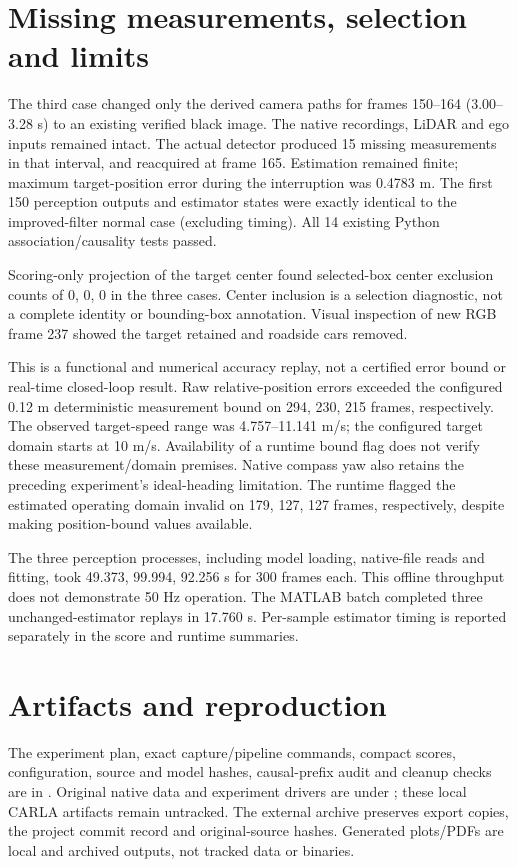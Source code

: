 \documentclass[11pt]{article}
\begin{document}
\section{Missing measurements, selection and limits}
The third case changed only the derived camera paths for frames 150--164
(3.00--3.28 s) to an existing verified black image. The native recordings,
LiDAR and ego inputs remained intact. The actual detector produced
15 missing measurements in that interval, and reacquired at frame
165. Estimation remained finite; maximum target-position error during
the interruption was 0.4783 m. The first 150 perception outputs and
estimator states were exactly identical to the improved-filter normal case
(excluding timing). All 14 existing Python association/causality tests passed.

Scoring-only projection of the target center found selected-box center
exclusion counts of 0, 0, 0 in the three cases. Center inclusion is a
selection diagnostic, not a complete identity or bounding-box annotation.
Visual inspection of new RGB frame 237 showed the target retained and
roadside cars removed.

This is a functional and numerical accuracy replay, not a certified error
bound or real-time closed-loop result. Raw relative-position errors exceeded
the configured 0.12 m deterministic measurement bound on 294, 230, 215
frames, respectively. The observed target-speed range was 4.757--11.141
m/s; the configured target domain starts at 10 m/s. Availability of a runtime
bound flag does not verify these measurement/domain premises. Native compass
yaw also retains the preceding experiment's ideal-heading limitation.
The runtime flagged the estimated operating domain invalid on 179, 127, 127
frames, respectively, despite making position-bound values available.

The three perception processes, including model loading, native-file reads
and fitting, took 49.373, 99.994, 92.256 s for 300 frames each. This offline
throughput does not demonstrate 50 Hz operation. The MATLAB batch completed
three unchanged-estimator replays in 17.760 s. Per-sample estimator
timing is reported separately in the score and runtime summaries.

\section{Artifacts and reproduction}
The experiment plan, exact capture/pipeline commands, compact scores,
configuration, source and model hashes, causal-prefix audit and cleanup checks
are in .
Original native data and experiment drivers are under
; these local CARLA
artifacts remain untracked. The external archive preserves export copies,
the project commit record and original-source hashes. Generated plots/PDFs
are local and archived outputs, not tracked data or binaries.
\end{document}
